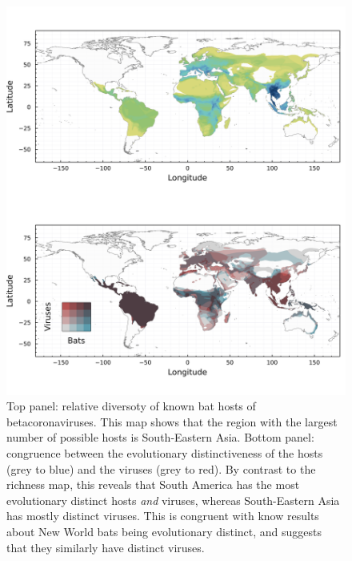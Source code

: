 \documentclass[10pt,oneside]{article}
\makeatletter
\def\maxwidth{\ifdim\Gin@nat@width>\linewidth\linewidth
\else\Gin@nat@width\fi}
\let\Oldincludegraphics\includegraphics
\renewcommand{\includegraphics}[1]{\Oldincludegraphics[width=\maxwidth]{#1}}
\makeatother
\begin{document}
\begin{figure}
\hypertarget{fig:richness}{%
\centering
\includegraphics{figures/combined_richness.png}
\caption{Top panel: relative diversoty of known bat hosts of
betacoronaviruses. This map shows that the region with the largest
number of possible hosts is South-Eastern Asia. Bottom panel: congruence
between the evolutionary distinctiveness of the hosts (grey to blue) and
the viruses (grey to red). By contrast to the richness map, this reveals
that South America has the most evolutionary distinct hosts \emph{and}
viruses, whereas South-Eastern Asia has mostly distinct viruses. This is
congruent with know results about New World bats being evolutionary
distinct, and suggests that they similarly have distinct
viruses.}\label{fig:richness}
}
\end{figure}
\end{document}
